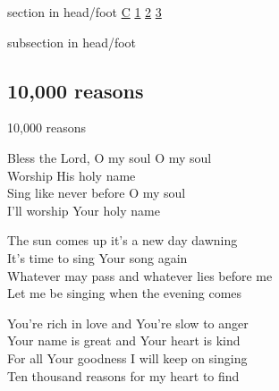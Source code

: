 \documentclass{beamer}
\begin{document}
{
{ 
 {
 \begin{beamercolorbox}[ht=4.5ex,dp=1.5ex,%
      leftskip=.3cm,rightskip=.3cm plus1fil]{section in head/foot}
 \fontsize{12}{25}\selectfont 
\hyperlink{10,000 reasons['Bless the Lord, O my soul']C}{C}
\hyperlink{10,000 reasons['Bless the Lord, O my soul']1}{1}
\hyperlink{10,000 reasons['Bless the Lord, O my soul']2}{2}
\hyperlink{10,000 reasons['Bless the Lord, O my soul']3}{3}
 
 \end{beamercolorbox}%
  \begin{beamercolorbox}[ht=2.5ex,dp=1.125ex,%
   leftskip=.3cm,rightskip=.3cm plus1fil]{subsection in head/foot}
   \insertauthor
 \end{beamercolorbox}%
 }
}
\subsection{ 10,000 reasons }

\hypertarget{10,000 reasons['Bless the Lord, O my soul']C}{}
\begin{frame}{10,000 reasons }
\fontsize{ 15 }{ 19 }\selectfont

Bless the Lord, O my soul O my soul\\ 
Worship His holy name\\ 
Sing like never before O my soul\\ 
I'll worship Your holy name 

\end{frame}

\hypertarget{10,000 reasons['Bless the Lord, O my soul']1}{}
\begin{frame}{}
\fontsize{ 15 }{ 19 }\selectfont

The sun comes up it's a new day dawning\\ 
It's time to sing Your song again\\ 
Whatever may pass and whatever lies before me\\ 
Let me be singing when the evening comes 

\end{frame}

\hypertarget{10,000 reasons['Bless the Lord, O my soul']2}{}
\begin{frame}{}
\fontsize{ 15 }{ 19 }\selectfont

You're rich in love and You're slow to anger\\ 
Your name is great and Your heart is kind\\ 
For all Your goodness I will keep on singing\\ 
Ten thousand reasons for my heart to find 


\end{frame}}
\end{document}
